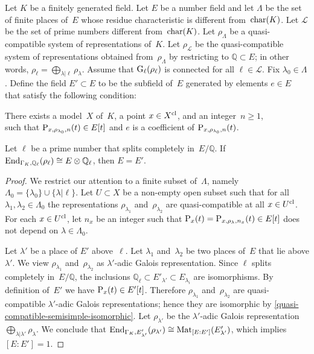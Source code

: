 \documentclass[10pt,twoside,leqno]{article}
\numberwithin{equation}{subsection}
\newcommand{\End}{\textnormal{End}}
\newcommand{\Mat}{\textnormal{Mat}}
\newcommand{\QQ}{\mathbb{Q}}
\newcommand{\QQl}{\QQ_{\ell}}
\newcommand{\primes}{\mathscr{L}}
\newcommand{\cl}{\textnormal{cl}}
\newcommand{\GG}{\textnormal{G}}
\newcommand{\Gl}{\GG_{\ell}}
\newcommand{\chrc}{\textnormal{char}}
\begin{document}
\begin{proposition} %
 \label{recover-endomorphisms}
 Let $K$ be a finitely generated field.
 Let $E$ be a number field
 and let $\Lambda$ be the set of finite places of~$E$
 whose residue characteristic is different from~$\chrc(K)$.
 \def\primes{\mathscr{L}}%
 Let $\primes$ be the set of prime numbers different from~$\chrc(K)$.
 Let $\rho_\Lambda$ be a quasi-compatible system of representations of~$K$.
 Let $\rho_\primes$ be the quasi-compatible system of representations
obtained from~$\rho_\Lambda$ by restricting to $\QQ \subset E$;
 in other words, $\rho_\ell = \bigoplus_{\lambda | \ell} \rho_\lambda$.
 Assume that $\Gl(\rho_\ell)$ is connected for all $\ell \in \primes$.
 Fix $\lambda_0 \in \Lambda$.
 Define the field $E' \subset E$ to be the
 subfield of~$E$ generated by elements $e \in E$
 that satisfy the following condition:

 {\narrower\noindent
  There exists a model~$X$ of~$K$,
  a point $x \in X^\cl$,
  and an integer~$n \ge 1$,\\
  such that $\mathrm{P}_{x,\rho_{\lambda_0},n}(t) \in E[t]$
  and $e$ is a coefficient of $\mathrm{P}_{x,\rho_{\lambda_0},n}(t)$.
  \par}

 \noindent
 Let $\ell$ be a prime number that splits completely in~$E/\QQ$.
 If $\End_{\Gamma_K,\QQl}(\rho_\ell) \cong E \otimes \QQl$,
 then $E = E'$.
 \begin{proof}
  We restrict our attention to a finite subset of~$\Lambda$,
  namely $\Lambda_0 = \{\lambda_0\} \cup \{ \lambda | \ell \}$.
  Let $U \subset X$ be a non-empty open subset such that
  for all $\lambda_1, \lambda_2 \in \Lambda_0$
  the representations
  $\rho_{\lambda_1}$ and~$\rho_{\lambda_2}$
  are quasi-compatible at all $x \in U^\cl$.
  For each $x \in U^\cl$,
  let $n_x$ be an integer such that
  $\mathrm{P}_x(t) = \mathrm{P}_{x,\rho_\lambda,n_x}(t) \in E[t]$
  does not depend on $\lambda \in \Lambda_0$.

  Let $\lambda'$ be a place of $E'$ above~$\ell$.
  Let $\lambda_1$ and~$\lambda_2$ be two places
  of~$E$ that lie above $\lambda'$.
  We view $\rho_{\lambda_1}$ and~$\rho_{\lambda_2}$
  as $\lambda'$-adic Galois representation.
  Since $\ell$ splits completely in~$E/\QQ$,
  the inclusions $\QQl \subset E'_{\lambda'} \subset E_{\lambda_i}$
  are isomorphisms.
  By definition of~$E'$ we have $\mathrm{P}_x(t) \in E'[t]$.
  Therefore $\rho_{\lambda_1}$ and~$\rho_{\lambda_2}$
  are quasi-compatible $\lambda'$-adic Galois representations;
  hence they are isomorphic by \cref{quasi-compatible-semisimple-isomorphic}.
  Let $\rho_{\lambda'}$ be the $\lambda'$-adic Galois representation
  $\bigoplus_{\lambda | \lambda'} \rho_\lambda$.
  We conclude that
  $\End_{\Gamma_K,E'_{\lambda'}}(\rho_{\lambda'})
   \cong \Mat_{[E:E']}(E'_{\lambda'})$,
  which implies $[E:E'] = 1$.
 \end{proof}
\end{proposition}
\end{document}
